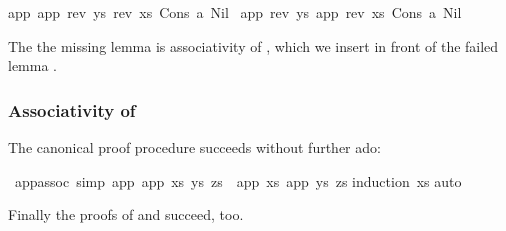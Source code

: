 \begin{isabellebody}
\begin{isamarkuptxt}
\begin{isabelle}
app\ {}app\ {}rev\ ys{}\ {}rev\ xs{}{}\ {}Cons\ a\ Nil{}\ {}\isanewline
{}app\ {}rev\ ys{}\ {}app\ {}rev\ xs{}\ {}Cons\ a\ Nil{}{}%
\end{isabelle}
The the missing lemma is associativity of ,
which we insert in front of the failed lemma .

\subsubsection{Associativity of }

The canonical proof procedure succeeds without further ado:%
\end{isamarkuptxt}%
\isamarkuptrue%
%
\endisatagproof
{\isafoldproof}%
%
\isadelimproof
%
\endisadelimproof
{}\isamarkupfalse%
\ app{}assoc\ {}simp{}{}\ {}app\ {}app\ xs\ ys{}\ zs\ {}\ app\ xs\ {}app\ ys\ zs{}{}\isanewline
%
\isadelimproof
%
\endisadelimproof
%
\isatagproof
{}\isamarkupfalse%
{}induction\ xs{}\isanewline
{}\isamarkupfalse%
{}auto{}\isanewline
{}\isamarkupfalse%
%
\endisatagproof
{\isafoldproof}%
%
\isadelimproof
%
\endisadelimproof
%
\isadelimproof
%
\endisadelimproof
%
\isatagproof
%
\endisatagproof
{\isafoldproof}%
%
\isadelimproof
%
\endisadelimproof
%
\isadelimproof
%
\endisadelimproof
%
\isatagproof
%
\endisatagproof
{\isafoldproof}%
%
\isadelimproof
%
\endisadelimproof
%
\begin{isamarkuptext}%
Finally the proofs of  and 
succeed, too.


\end{isamarkuptext}
\end{isabellebody}
